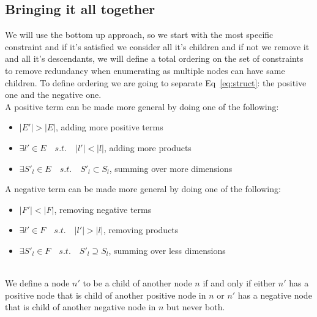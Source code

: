 \documentclass{article}
\begin{document}
\subsection{Bringing it all together}
We will use the bottom up approach, so we start with the most specific constraint and if it's satisfied we consider all it's children and if not we remove it and all it's descendants, we will define a total ordering on the set of constraints to remove redundancy when enumerating as multiple nodes can have same children. To define ordering we are going to separate Eq~\ref{eq:struct}: the positive one and the negative one.
\\
A positive term can be made more general by doing one of the following:
\begin{itemize}
\item $|E'| > |E|$, adding more positive terms
\item $\exists l'\in E \quad s.t. \quad  |l'| < |l|$, adding more products 
\item $\exists S'_l\in E \quad s.t. \quad S'_l \subset S_l$, summing over more dimensions
\end{itemize}
A negative term can be made more general by doing one of the following:
\begin{itemize}
\item $|F'| < |F|$, removing negative terms
\item $\exists l'\in F \quad s.t. \quad  |l'| > |l|$, removing products 
\item $\exists S'_l\in F \quad s.t. \quad S'_l \supseteq S_l$, summing over less dimensions
\end{itemize}
\\
We define a node $n'$  to be a child of another node $n$ if and only if either $n'$ has a positive node that is child of another positive node in $n$ or $n'$ has a negative node that is child of another negative node in $n$ but never both.




\end{document}
